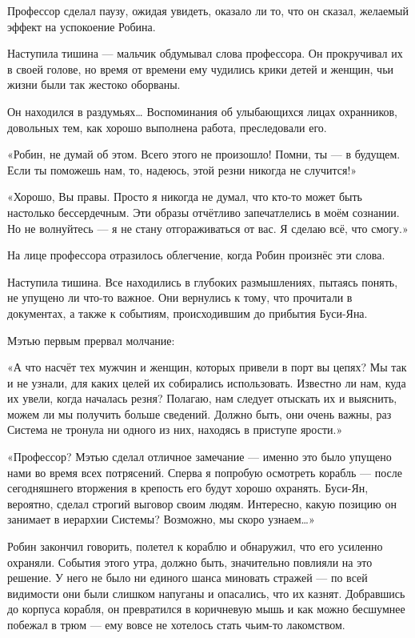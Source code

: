 \documentclass[a4paper,12pt]{book}
\begin{document}
\par
Профессор сделал паузу, ожидая увидеть, оказало ли то, что он сказал, желаемый эффект на успокоение Робина.
\par
Наступила тишина — мальчик обдумывал слова профессора. Он прокручивал их в своей голове, но время от времени ему чудились крики детей и женщин, чьи жизни были так жестоко оборваны.
\par
Он находился в раздумьях… Воспоминания об улыбающихся лицах охранников, довольных тем, как хорошо выполнена работа, преследовали его.
\par
«Робин, не думай об этом. Всего этого не произошло! Помни, ты — в будущем. Если ты поможешь нам, то, надеюсь, этой резни никогда не случится!»
\par
«Хорошо, Вы правы. Просто я никогда не думал, что кто-то может быть настолько бессердечным. Эти образы отчётливо запечатлелись в моём сознании. Но не волнуйтесь — я не стану отгораживаться от вас. Я сделаю всё, что смогу.»
\par
На лице профессора отразилось облегчение, когда Робин произнёс эти слова.
\par
Наступила тишина. Все находились в глубоких размышлениях, пытаясь понять, не упущено ли что-то важное. Они вернулись к тому, что прочитали в документах, а также к событиям, происходившим до прибытия Буси-Яна.
\par
Мэтью первым прервал молчание:
\par
«А что насчёт тех мужчин и женщин, которых привели в порт вы цепях? Мы так и не узнали, для каких целей их собирались использовать. Известно ли нам, куда их увели, когда началась резня? Полагаю, нам следует отыскать их и выяснить, можем ли мы получить больше сведений. Должно быть, они очень важны, раз Система не тронула ни одного из них, находясь в приступе ярости.»
\par
«Профессор? Мэтью сделал отличное замечание — именно это было упущено нами во время всех потрясений. Сперва я попробую осмотреть корабль — после сегодняшнего вторжения в крепость его будут хорошо охранять. Буси-Ян, вероятно, сделал строгий выговор своим людям. Интересно, какую позицию он занимает в иерархии Системы? Возможно, мы скоро узнаем…»
\par
Робин закончил говорить, полетел к кораблю и обнаружил, что его усиленно охраняли. События этого утра, должно быть, значительно повлияли на это решение. У него не было ни единого шанса миновать стражей — по всей видимости они были слишком напуганы и опасались, что их казнят. Добравшись до корпуса корабля, он превратился в коричневую мышь и как можно бесшумнее побежал в трюм — ему вовсе не хотелось стать чьим-то лакомством.
\end{document}

